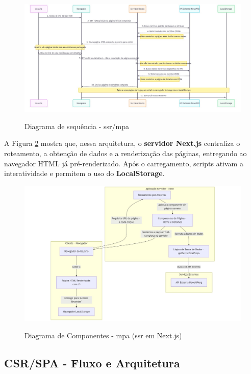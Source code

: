 \begin{figure}[H]
  \centering
  \caption{Diagrama de sequência - \acrshort{ssr}/\acrshort{mpa}}
  \includegraphics[width=1\textwidth]{media/wall_tech_sequence_diagram.jpeg}
  \label{fig:sequence-diagram-ssr}
\end{figure}


A Figura \ref{fig:component-diagram-next} mostra que, nessa arquitetura, o \textbf{servidor Next.js} centraliza o roteamento, a obtenção de dados e a renderização das páginas, entregando ao navegador HTML já pré-renderizado. Após o carregamento, scripts ativam a interatividade e permitem o uso do \textbf{LocalStorage}.

\begin{figure}[H]
  \centering
  \caption{Diagrama de Componentes - \acrshort{mpa} (\acrshort{ssr} em Next.js)}
  \includegraphics[width=1\textwidth]{media/component-diagram-next.jpeg}
  \label{fig:component-diagram-next}
\end{figure}


\subsection{CSR/SPA - Fluxo e Arquitetura}
\label{subsec:csr-spa}

